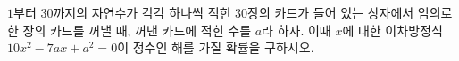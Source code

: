 $1$부터 $30$까지의 자연수가 각각 하나씩 적힌 $30$장의 카드가 들어 있는 상자에서 임의로 한 장의 카드를 꺼낼 때, 꺼낸 카드에 적힌 수를 $a$라 하자. 이때 $x$에 대한 이차방정식 $10x^2-7ax+a^2=0$이 정수인 해를 가질 확률을 구하시오.
